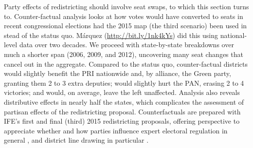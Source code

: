 \documentclass[letter,12pt]{article}
\begin{document}
Party effects of redistricting should involve seat swaps, to which this section turns to. Counter-factual analysis looks at how votes would have converted to seats in recent congressional elections had the 2015 map (the third scenario) been used in stead of the status quo. M\'arquez (\href{http://bit.ly/1nk4kYs}{\url{http://bit.ly/1nk4kYs}}) did this using national-level data over two decades. We proceed with state-by-state breakdowns over much a shorter span (2006, 2009, and 2012), uncovering many seat changes that cancel out in the aggregate. Compared to the status quo, counter-factual districts would slightly benefit the PRI nationwide and, by alliance, the Green party, granting them 2 to 3 extra deputies; would slightly hurt the PAN, erasing 2 to 4 victories; and would, on average, leave the left unaffected. Analysis also reveals distributive effects in nearly half the states, which complicates the assessment of partisan effects of the redistricting proposal. Counterfactuals are prepared with IFE's first and final (third) 2015 redistricting proposals, offering perspective to appreciate whether and how parties influence expert electoral regulation in general \citep{estevez.magar.rosas.2008}, and district line drawing in particular \citep{rossiter.etal.1997,cox.katz.2002}. 


\end{document}
